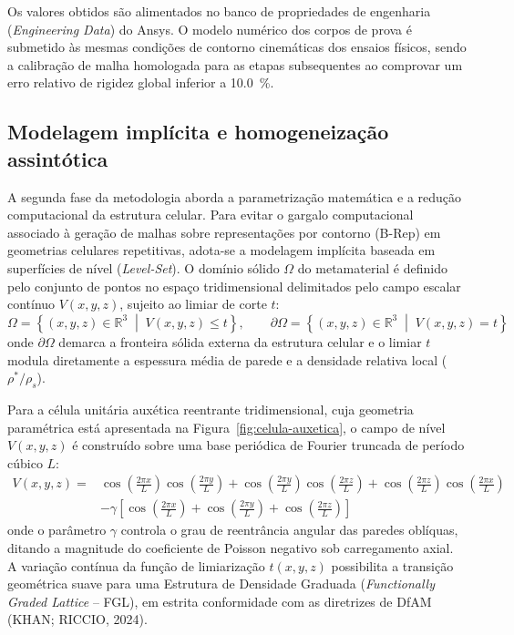 Os valores obtidos são alimentados no banco de propriedades de engenharia (\textit{Engineering Data}) do Ansys. O modelo numérico dos corpos de prova é submetido às mesmas condições de contorno cinemáticas dos ensaios físicos, sendo a calibração de malha homologada para as etapas subsequentes ao comprovar um erro relativo de rigidez global inferior a \SI{10.0}{\percent}.

\subsection{Modelagem implícita e homogeneização assintótica}
\label{subsec:implicita}

A segunda fase da metodologia aborda a parametrização matemática e a redução computacional da estrutura celular. Para evitar o gargalo computacional associado à geração de malhas sobre representações por contorno (B-Rep) em geometrias celulares repetitivas, adota-se a modelagem implícita baseada em superfícies de nível (\textit{Level-Set}). O domínio sólido $\Omega$ do metamaterial é definido pelo conjunto de pontos no espaço tridimensional delimitados pelo campo escalar contínuo $V(x,y,z)$, sujeito ao limiar de corte $t$:
\begin{equation}
  \Omega = \left\{ (x,y,z) \in \mathbb{R}^3 \;\middle|\; V(x,y,z) \le t \right\}, \qquad \partial\Omega = \left\{ (x,y,z) \in \mathbb{R}^3 \;\middle|\; V(x,y,z) = t \right\}
  \label{eq:iso}
\end{equation}
onde $\partial\Omega$ demarca a fronteira sólida externa da estrutura celular e o limiar $t$ modula diretamente a espessura média de parede e a densidade relativa local ($\rho^{*}/\rho_s$).

Para a célula unitária auxética reentrante tridimensional, cuja geometria paramétrica está apresentada na Figura~\ref{fig:celula-auxetica}, o campo de nível $V(x,y,z)$ é construído sobre uma base periódica de Fourier truncada de período cúbico $L$:
\begin{equation}
  \begin{aligned}
    V(x,y,z) ={}& \cos\!\left(\tfrac{2\pi x}{L}\right)\cos\!\left(\tfrac{2\pi y}{L}\right)
      + \cos\!\left(\tfrac{2\pi y}{L}\right)\cos\!\left(\tfrac{2\pi z}{L}\right)
      + \cos\!\left(\tfrac{2\pi z}{L}\right)\cos\!\left(\tfrac{2\pi x}{L}\right) \\
    & - \gamma \left[ \cos\!\left(\tfrac{2\pi x}{L}\right) + \cos\!\left(\tfrac{2\pi y}{L}\right) + \cos\!\left(\tfrac{2\pi z}{L}\right) \right]
  \end{aligned}
  \label{eq:fourier}
\end{equation}
onde o parâmetro $\gamma$ controla o grau de reentrância angular das paredes oblíquas, ditando a magnitude do coeficiente de Poisson negativo sob carregamento axial. A variação contínua da função de limiarização $t(x,y,z)$ possibilita a transição geométrica suave para uma Estrutura de Densidade Graduada (\textit{Functionally Graded Lattice} -- FGL), em estrita conformidade com as diretrizes de DfAM (KHAN; RICCIO, 2024).

